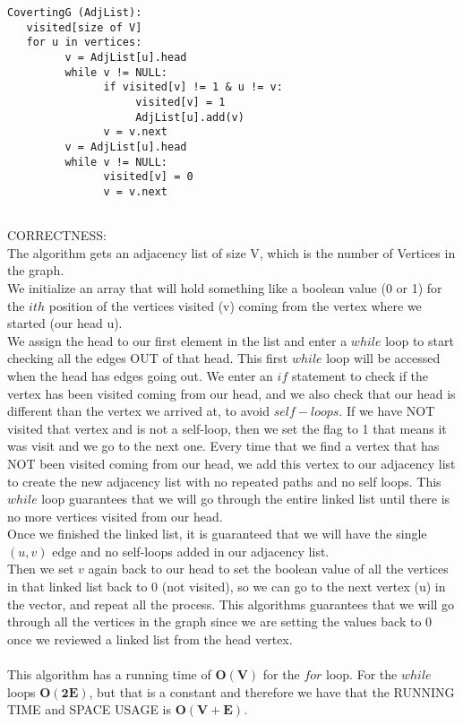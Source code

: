 \documentclass[12pt]{article} \setlength{\oddsidemargin}{0in}
\begin{document}
\begin{verbatim}
CovertingG (AdjList):
   visited[size of V]
   for u in vertices:
         v = AdjList[u].head
         while v != NULL:
               if visited[v] != 1 & u != v:
                    visited[v] = 1
                    AdjList[u].add(v)
               v = v.next
         v = AdjList[u].head
         while v != NULL:
               visited[v] = 0
               v = v.next
   
\end{verbatim}
CORRECTNESS:\\
The algorithm gets an adjacency list of size V, which is the number of Vertices in the graph. \\
We initialize an array that will hold something like a boolean value (0 or 1) for the $ith$ position of the vertices visited (v) coming from the vertex where we started (our head u).\\
We assign the head to our first element in the list and enter a $while$ loop to start checking all the edges OUT of that head. This first $while$ loop will be accessed when the head has edges going out. We enter an $if$ statement to check if the vertex has been visited coming from our head, and we also check that our head is different than the vertex we arrived at, to avoid $self-loops$. If we have NOT visited that vertex and is not a self-loop, then we set the flag to 1 that means it was visit and we go to the next one. Every time that we find a vertex that has NOT been visited coming from our head, we add this vertex to our adjacency list to create the new adjacency list with no repeated paths and no self loops. This $while$ loop guarantees that we will go through the entire linked list until there is no more vertices visited from our head. \\ Once we finished the linked list, it is guaranteed that we will have the single $(u,v)$ edge and no self-loops added in our adjacency list. \\
Then we set $v$ again back to our head to set the boolean value of all the vertices in that linked list back to 0 (not visited), so we can go to the next vertex (u) in the vector, and repeat all the process. This algorithms guarantees that we will go through all the vertices in the graph since we are setting the values back to 0 once we reviewed a linked list from the head vertex.\\\\
This algorithm has a running time of $\mathbf{O(V)}$ for the $for$ loop. For the $while$ loops $\mathbf{O(2E)}$, but that is a constant and therefore we have that the RUNNING TIME and SPACE USAGE is $\mathbf{O(V+E)}$.
\end{document}
